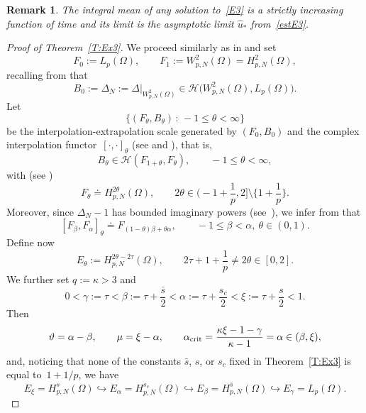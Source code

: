 \documentclass[reqno,11pt]{amsart}
\numberwithin{equation}{section}
\newtheorem{rem}[thm]{Remark}
\theoremstyle{remark}
\begin{document}
\begin{rem}\label{R:Ex3} 
The integral mean of any solution to~\eqref{E3} is a strictly increasing function of time and its limit is the asymptotic limit $\hat u_*$ from~\eqref{estE3}.
\end{rem}


\begin{proof}[Proof of Theorem~\ref{T:Ex3}] We proceed similarly as in \cite{MRW25} and set
\[
 F_0:=L_p(\Omega),  \qquad  F_1:= W_{p,N}^{2}(\Omega)=H_{p,N}^{2}(\Omega),
 \] 
 recalling from  \cite[\S 4]{Am93} that 
\[
B_0:=\Delta_N:=\Delta|_{W_{p,N}^{2}(\Omega)}\in \mathcal{H}\big(W_{p,N}^{2}(\Omega),L_p(\Omega)\big).
\]
Let
$$
\big\{(F_\theta,B_\theta)\,:\, -1\le \theta<\infty\big\}
$$
be the interpolation-extrapolation scale generated by $(F_0,B_0)$ and the 
complex interpolation functor~$[\cdot,\cdot]_\theta$ (see \cite[\S 6]{Am93} and \cite[\S V.1]{LQPP}), that is,
\begin{equation*}
B_\theta\in \mathcal{H}(F_{1+\theta},F_\theta),\qquad -1\le \theta<\infty,
\end{equation*}
with (see \cite[Theorem~7.1; Equation (7.5)]{Am93})
\begin{equation}\label{f2N}
 F_\theta\doteq H_{p,N}^{2\theta}(\Omega),\qquad   2\theta\in\Big(-1+\frac{1}{p},2\Big]\setminus\Big\{1+\frac{1}{p}\Big\}.
\end{equation}
Moreover, since
$\Delta_N-1$ has bounded imaginary powers (see~\cite[III.~Examples 4.7.3~(d)]{LQPP}), we infer from \cite[Remarks~6.1~(d)]{Am93} that
\begin{equation}\label{f3N}
 [F_\beta,F_\alpha]_\theta\doteq F_{(1-\theta)\beta+\theta\alpha},\qquad -1\leq \beta<\alpha,\ \theta\in(0,1).
\end{equation}
Define now
\[
E_\theta:=   H^{2\theta-2\tau}_{p,N}(\Omega),\qquad 2\tau+1+\frac{1}{p}\neq 2\theta\in[0,2].
\]
We further set $q := \kappa > 3$ and 
\begin{equation}\label{bnnn1}
0 < \gamma := \tau < \beta := \tau + \frac{\bar s}{2}< \alpha := \tau + \frac{s_c}{2}< \xi := \tau + \frac{s}{2} < 1.
\end{equation}
Then
\[
\vartheta = \alpha - \beta, \qquad \mu = \xi - \alpha,
 \qquad\alpha_{\rm crit}= \frac{\kappa \xi - 1 - \gamma}{\kappa - 1}= \alpha\in (\beta, \xi),
\]
and, noticing that none of the constants $\bar s$, $s$, or $s_c$ fixed in Theorem~\ref{T:Ex3}  is equal to~$1+1/p$, we have
\[
E_\xi = H^{s}_{p,N}(\Omega)\hookrightarrow E_\alpha = H^{s_c}_{p,N}(\Omega)
\hookrightarrow E_\beta = H^{\bar s}_{p,N}(\Omega)\hookrightarrow E_\gamma= L_{p}(\Omega).
\]


\end{proof}
\end{document}
